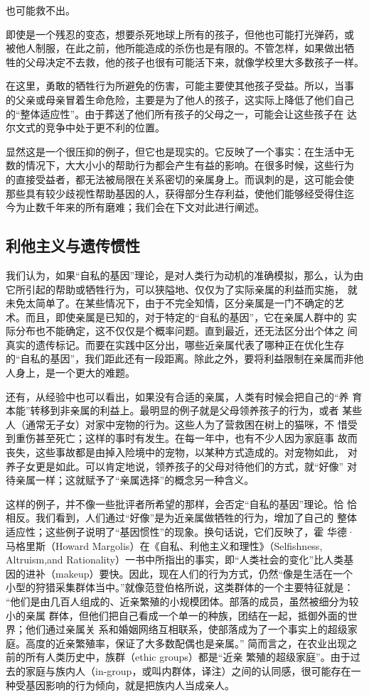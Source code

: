 也可能救不出。

即使是一个残忍的变态，想要杀死地球上所有的孩子，但他也可能打光弹药，或 被他人制服，在此之前，他所能造成的杀伤也是有限的。不管怎样，如果做出牺 牲的父母决定不去救，他的孩子也很有可能活下来，就像学校里大多数孩子一样。

在这里，勇敢的牺牲行为所避免的伤害，可能主要使其他孩子受益。所以，当事 的父亲或母亲冒着生命危险，主要是为了他人的孩子，这实际上降低了他们自己 的“整体适应性”。由于葬送了他们所有孩子的父母之一，可能会让这些孩子在 达尔文式的竞争中处于更不利的位置。

显然这是一个很压抑的例子，但它也是现实的。它反映了一个事实：在生活中无 数的情况下，大大小小的帮助行为都会产生有益的影响。在很多时候，这些行为 的直接受益者，都无法被局限在关系密切的亲属身上。而讽刺的是，这可能会使  那些具有较少歧视性帮助基因的人，获得部分生存利益，使他们能够经受得住迄 今为止数千年来的所有磨难；我们会在下文对此进行阐述。

\subsection{利他主义与遗传惯性}

我们认为，如果“自私的基因”理论，是对人类行为动机的准确模拟，那么，认为由它所引起的帮助或牺牲行为，可以狭隘地、仅仅为了实际亲属的利益而实施， 就未免太简单了。在某些情况下，由于不完全知情，区分亲属是一门不确定的艺 术。而且，即使亲属是已知的，对于特定的“自私的基因”，它在亲属人群中的 实际分布也不能确定，这不仅仅是个概率问题。直到最近，还无法区分出个体之 间真实的遗传标记。而要在实践中区分出，哪些近亲属代表了哪种正在优化生存 的“自私的基因”，我们距此还有一段距离。除此之外，要将利益限制在亲属而非他人身上，是一个更大的难题。

还有，从经验中也可以看出，如果没有合适的亲属，人类有时候会把自己的“养 育本能”转移到非亲属的利益上。最明显的例子就是父母领养孩子的行为，或者 某些人（通常无子女）对家中宠物的行为。这些人为了营救困在树上的猫咪，不 惜受到重伤甚至死亡；这样的事时有发生。在每一年中，也有不少人因为家庭事 故而丧失，这些事故都是由掉入险境中的宠物，以某种方式造成的。对宠物如此， 对养子女更是如此。可以肯定地说，领养孩子的父母对待他们的方式，就“好像” 对待亲属一样；这就赋予了“亲属选择”的概念另一种含义。

这样的例子，并不像一些批评者所希望的那样，会否定“自私的基因”理论。恰 恰相反。我们看到，人们通过“好像”是为近亲属做牺牲的行为，增加了自己的 整体适应性；这些例子说明了“基因惯性”的现象。换句话说，它们反映了，霍  华德·马格里斯（Howard Margolis）在《自私、利他主义和理性》（Selfishness, Altruism,and Rationality）一书中所指出的事实，即“人类社会的变化”比人类基 因的进补（makeup）要快。因此，现在人们的行为方式，仍然“像是生活在一个 小型的狩猎采集群体当中。”就像范登伯格所说，这类群体的一个主要特征就是： “他们是由几百人组成的、近亲繁殖的小规模团体。部落的成员，虽然被细分为较小的亲属 群体，但他们把自己看成一个单一的种族，团结在一起，抵御外面的世界；他们通过亲属关 系和婚姻网络互相联系，使部落成为了一个事实上的超级家庭。高度的近亲繁殖率，保证了大多数配偶也是亲属。” 简而言之，在农业出现之前的所有人类历史中，族群（ethic groups）都是“近亲 繁殖的超级家庭”。由于过去的家庭与族内人（in-group，或叫内群体，译注）之间的认同感，很可能存在一种受基因影响的行为倾向，就是把族内人当成亲人。

